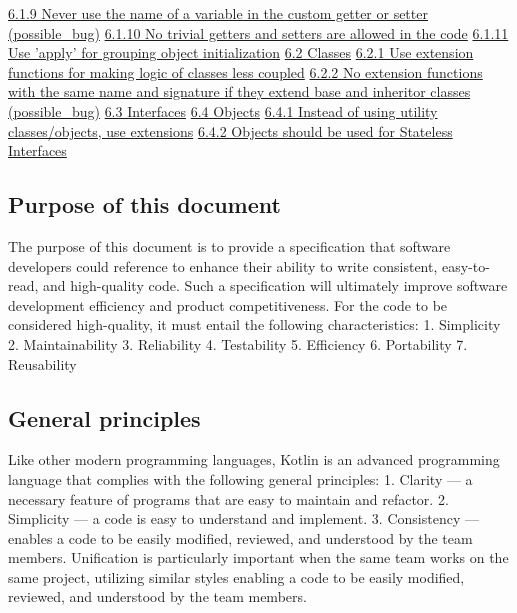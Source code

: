 \hspace{1.0cm}\hyperref[sec:6.1.9]{ 6.1.9 Never use the name of a variable in the custom getter or setter (possible\_bug)}
\hspace{1.0cm}\hyperref[sec:6.1.10]{ 6.1.10 No trivial getters and setters are allowed in the code}
\hspace{1.0cm}\hyperref[sec:6.1.11]{ 6.1.11 Use 'apply' for grouping object initialization}
\hspace{0.5cm}\hyperref[sec:6.2]{ 6.2 Classes}
\hspace{1.0cm}\hyperref[sec:6.2.1]{ 6.2.1 Use extension functions for making logic of classes less coupled}
\hspace{1.0cm}\hyperref[sec:6.2.2]{ 6.2.2 No extension functions with the same name and signature if they extend base and inheritor classes (possible\_bug)}
\hspace{0.5cm}\hyperref[sec:6.3]{ 6.3 Interfaces}
\hspace{0.5cm}\hyperref[sec:6.4]{ 6.4 Objects}
\hspace{1.0cm}\hyperref[sec:6.4.1]{ 6.4.1 Instead of using utility classes/objects, use extensions}
\hspace{1.0cm}\hyperref[sec:6.4.2]{ 6.4.2 Objects should be used for Stateless Interfaces}
\subsection*{\textbf{Purpose of this document}}
\label{sec:}
The purpose of this document is to provide a specification that software developers could reference to enhance their ability to write consistent, easy-to-read, and high-quality code.
Such a specification will ultimately improve software development efficiency and product competitiveness.
For the code to be considered high-quality, it must entail the following characteristics:
1.	Simplicity
2.	Maintainability
3.	Reliability
4.	Testability
5.	Efficiency
6.	Portability
7.	Reusability
\subsection*{\textbf{General principles}}
Like other modern programming languages, Kotlin is an advanced programming language that complies with the following general principles:
1.	Clarity — a necessary feature of programs that are easy to maintain and refactor.
2.	Simplicity — a code is easy to understand and implement.
3.	Consistency — enables a code to be easily modified, reviewed, and understood by the team members. Unification is particularly important when the same team works on the same project, utilizing similar styles enabling a code to be easily modified, reviewed, and understood by the team members.



